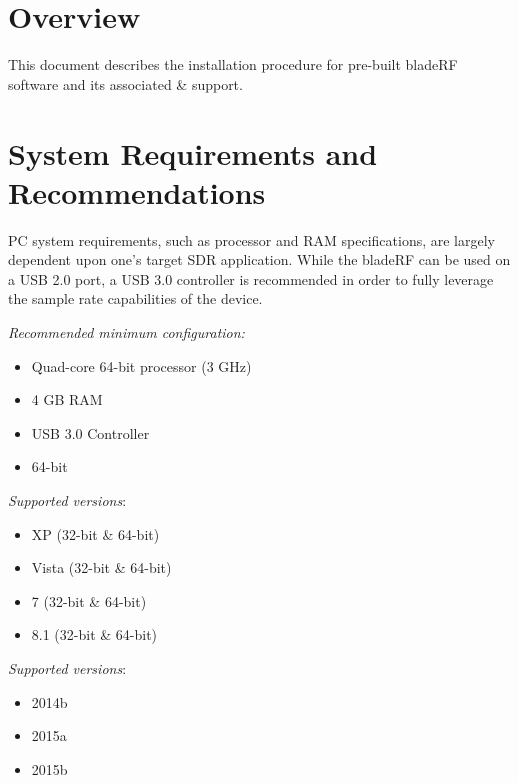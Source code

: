 \section{Overview}
This document describes the \windows installation procedure for pre-built
bladeRF software and its associated \matlab \& \simulink support.

\vspace{0.25in}

\section{System Requirements and Recommendations}

PC system requirements, such as processor and RAM specifications, are
largely dependent upon one's target SDR application. While the bladeRF
can be used on a USB 2.0 port, a USB 3.0 controller is recommended in
order to fully leverage the sample rate capabilities of the device.

\vspace{0.125in}

\textit{Recommended minimum configuration:}
\begin{itemize}
  \item Quad-core 64-bit processor (3 GHz)
  \item 4 GB RAM
  \item USB 3.0 Controller
  \item {} 64-bit
\end{itemize}

\vspace{0.125in}

\textit{Supported \windows versions}:
\begin{itemize}
  \item XP (32-bit \& 64-bit)
  \item Vista (32-bit \& 64-bit)
  \item 7 (32-bit \& 64-bit)
  \item 8.1 (32-bit \& 64-bit)
\end{itemize}

\vspace{0.125in}

\textit{Supported \matlab versions}:
\begin{itemize}
  \item 2014b
  \item 2015a
  \item 2015b
\end{itemize}

